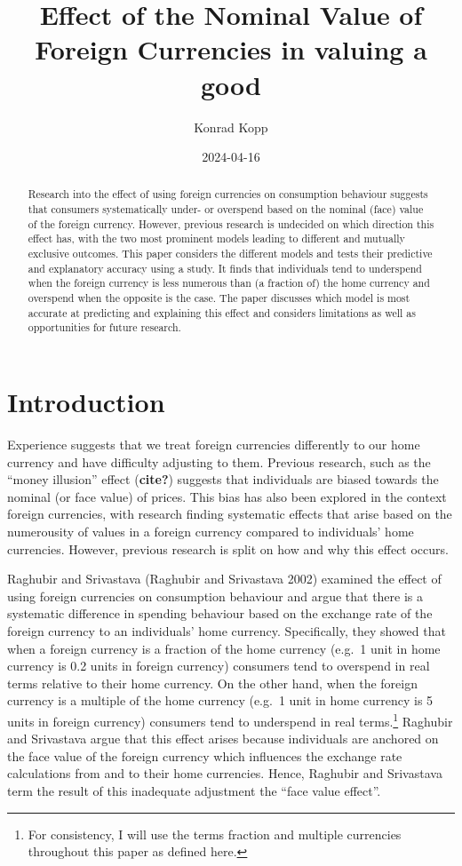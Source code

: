 \documentclass[
]{report}
\title{Effect of the Nominal Value of Foreign Currencies in valuing a
good}
\author{Konrad Kopp}
\affil{%
                  University of Oxford
              }
\date{2024-04-16}
\renewcommand*\contentsname{Table of contents}
\newcommand\contentsname{Table of contents}
\begin{document}
\maketitle
\begin{abstract}
Research into the effect of using foreign currencies on consumption
behaviour suggests that consumers systematically under- or overspend
based on the nominal (face) value of the foreign currency. However,
previous research is undecided on which direction this effect has, with
the two most prominent models leading to different and mutually
exclusive outcomes. This paper considers the different models and tests
their predictive and explanatory accuracy using a study. It finds that
individuals tend to underspend when the foreign currency is less
numerous than (a fraction of) the home currency and overspend when the
opposite is the case. The paper discusses which model is most accurate
at predicting and explaining this effect and considers limitations as
well as opportunities for future research.
\end{abstract}

\renewcommand*\contentsname{Table of contents}
{
\hypersetup{linkcolor=}
\setcounter{tocdepth}{2}
\tableofcontents
}
\chapter{Introduction}\label{introduction}

Experience suggests that we treat foreign currencies differently to our
home currency and have difficulty adjusting to them. Previous research,
such as the ``money illusion'' effect (\textbf{cite?}) suggests that
individuals are biased towards the nominal (or face value) of prices.
This bias has also been explored in the context foreign currencies, with
research finding systematic effects that arise based on the numerousity
of values in a foreign currency compared to individuals' home
currencies. However, previous research is split on how and why this
effect occurs.

Raghubir and Srivastava (Raghubir and Srivastava 2002) examined the
effect of using foreign currencies on consumption behaviour and argue
that there is a systematic difference in spending behaviour based on the
exchange rate of the foreign currency to an individuals' home currency.
Specifically, they showed that when a foreign currency is a fraction of
the home currency (e.g.~1 unit in home currency is 0.2 units in foreign
currency) consumers tend to overspend in real terms relative to their
home currency. On the other hand, when the foreign currency is a
multiple of the home currency (e.g.~1 unit in home currency is 5 units
in foreign currency) consumers tend to underspend in real
terms.\footnote{For consistency, I will use the terms fraction and
  multiple currencies throughout this paper as defined here.} Raghubir
and Srivastava argue that this effect arises because individuals are
anchored on the face value of the foreign currency which influences the
exchange rate calculations from and to their home currencies. Hence,
Raghubir and Srivastava term the result of this inadequate adjustment
the ``face value effect''.
\end{document}
